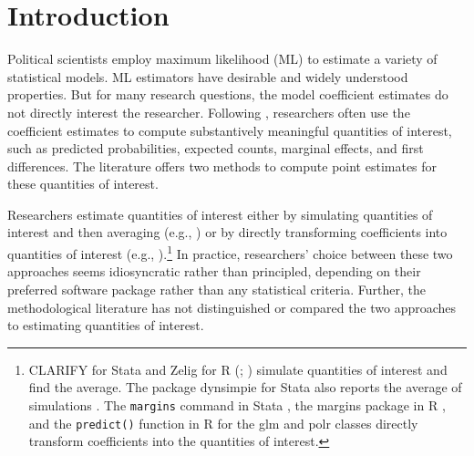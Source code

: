 \documentclass[12pt]{article}
\begin{document}


\thispagestyle{empty}
\newpage

\doublespace
\section*{Introduction}

\setcounter{page}{1}

Political scientists employ maximum likelihood (ML) to estimate a variety of statistical models. 
ML estimators have desirable and widely understood properties. 
But for many research questions, the model coefficient estimates do not directly interest the researcher. 
Following \cite{KingTomzWittenberg2000}, researchers often use the coefficient estimates to compute substantively meaningful quantities of interest, such as predicted probabilities, expected counts, marginal effects, and first differences. The literature offers two methods to compute point estimates for these quantities of interest. 

Researchers estimate quantities of interest either by simulating quantities of interest and then averaging (e.g., \citealt{KingTomzWittenberg2000}) or by directly transforming coefficients into quantities of interest (e.g., \citealt{Herron1999}).\footnote{CLARIFY for Stata \citep{TomzWittenbergKing2003} and Zelig for R (\citealt{ImaiKingLau2008}; \citealt{Choiratetal}) simulate quantities of interest and find the average. The package dynsimpie for Stata also reports the average of simulations \citep{philips2016dynsimpie, jung2020command}.
The \texttt{margins} command in Stata \citep{StataManual}, the margins package in R \citep{margins}, and the \texttt{predict()} function in R for the glm \citep{R} and polr \citep{MASS} classes directly transform coefficients into the quantities of interest.}
 In practice, researchers' choice between these two approaches seems idiosyncratic rather than principled, depending on their preferred software package rather than any statistical criteria. 
Further, the methodological literature has not distinguished or compared the two approaches to estimating quantities of interest.
\end{document}
